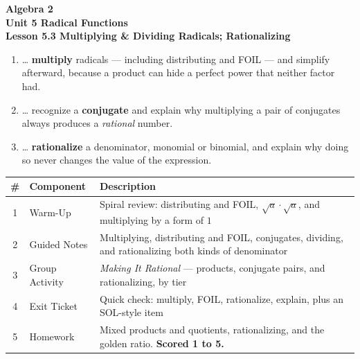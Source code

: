 \documentclass[10pt]{article}
\begin{document}
\vspace{-0.8in}

\begin{center}
  {\color{white}\textbf{\LARGE Algebra 2}}\\[4pt]
  {\color{forestmid}\large\textbf{Unit 5 \quad Radical Functions}}\\[6pt]
  {\color{white}\textbf{\large Lesson 5.3 \quad Multiplying \& Dividing Radicals; Rationalizing}}
\end{center}

\vspace{0.22in}
\namedateperiod
\vspace{0.18in}

\begin{learningtargetbox}
\small
\begin{enumerate}[leftmargin=1.5em, itemsep=5pt]
  \item \ldots{} \textbf{multiply} radicals --- including distributing and FOIL --- and simplify afterward, because a product can hide a perfect power that neither factor had.
  \item \ldots{} recognize a \textbf{conjugate} and explain why multiplying a pair of conjugates always produces a \emph{rational} number.
  \item \ldots{} \textbf{rationalize} a denominator, monomial or binomial, and explain why doing so never changes the value of the expression.
\end{enumerate}
\end{learningtargetbox}

\vspace{0.14in}

\begin{tocbox}
\small
\renewcommand{\arraystretch}{1.5}
\begin{tabularx}{\linewidth}{@{} c l X @{}}
\rowcolor{forestbg}
\textbf{\#} & \textbf{Component} & \textbf{Description} \\
\midrule
1 & Warm-Up        & Spiral review: distributing and FOIL, $\sqrt a\cdot\sqrt a$, and multiplying by a form of $1$ \\
2 & Guided Notes   & Multiplying, distributing and FOIL, conjugates, dividing, and rationalizing both kinds of denominator \\
3 & Group Activity & \emph{Making It Rational} --- products, conjugate pairs, and rationalizing, by tier \\
4 & Exit Ticket    & Quick check: multiply, FOIL, rationalize, explain, plus an SOL-style item \\
5 & Homework       & Mixed products and quotients, rationalizing, and the golden ratio. \textbf{Scored 1 to 5.} \\
\end{tabularx}
\end{tocbox}
\end{document}
